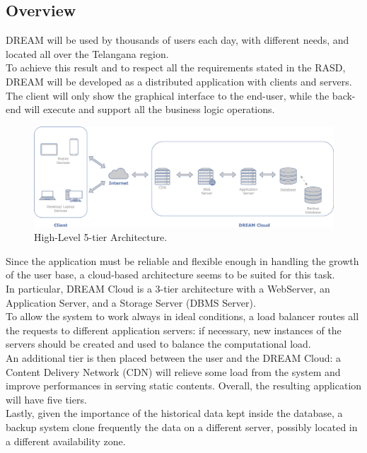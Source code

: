 \subsection{Overview}
DREAM will be used by thousands of users each day, with different needs, and located all over the Telangana region.\\
To achieve this result and to respect all the requirements stated in the RASD, DREAM will be developed as a distributed application with clients and servers.\\
The client will only show the graphical interface to the end-user, while the back-end will execute and support all the business logic operations. 
\begin{figure}[hbt!]
\centering
\includegraphics[width=\textwidth]{../images_diagrams/dd/highlevel_arch.png}
\caption{High-Level 5-tier Architecture.}
\label{fig:highLevelArch}
\end{figure}

Since the application must be reliable and flexible enough in handling the growth of the user base, a cloud-based architecture seems to be suited for this task.\\
In particular, DREAM Cloud is a 3-tier architecture with a WebServer, an Application Server, and a Storage Server (DBMS Server).\\
To allow the system to work always in ideal conditions, a load balancer routes all the requests to different application servers: if necessary, new instances of the servers should be created and used to balance the computational load.\\
An additional tier is then placed between the user and the DREAM Cloud: a Content Delivery Network (CDN) will relieve some load from the system and improve performances in serving static contents. Overall, the resulting application will have five tiers.\\
Lastly, given the importance of the historical data kept inside the database, a backup system clone frequently the data on a different server, possibly located in a different availability zone.\\ 

